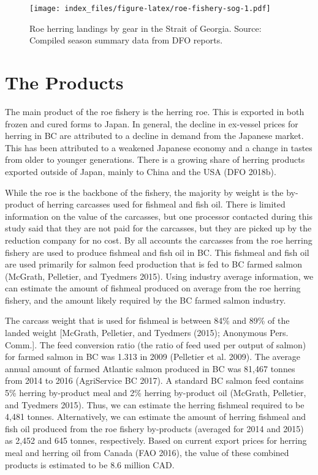 \documentclass[]{article}
\theoremstyle{definition}
\theoremstyle{definition}
\theoremstyle{definition}
\theoremstyle{remark}
\begin{document}
\begin{figure}
\centering
\texttt{[image: index\_files/figure-latex/roe-fishery-sog-1.pdf]}
\caption{\label{fig:roe-fishery-sog}Roe herring landings by gear in the
Strait of Georgia. Source: Compiled season summary data from DFO
reports.}
\end{figure}

\section{The Products}\label{the-products}

The main product of the roe fishery is the herring roe. This is exported
in both frozen and cured forms to Japan. In general, the decline in
ex-vessel prices for herring in BC are attributed to a decline in demand
from the Japanese market. This has been attributed to a weakened
Japanese economy and a change in tastes from older to younger
generations. There is a growing share of herring products exported
outside of Japan, mainly to China and the USA (DFO 2018b).

While the roe is the backbone of the fishery, the majority by weight is
the by-product of herring carcasses used for fishmeal and fish oil.
There is limited information on the value of the carcasses, but one
processor contacted during this study said that they are not paid for
the carcasses, but they are picked up by the reduction company for no
cost. By all accounts the carcasses from the roe herring fishery are
used to produce fishmeal and fish oil in BC. This fishmeal and fish oil
are used primarily for salmon feed production that is fed to BC farmed
salmon (McGrath, Pelletier, and Tyedmers 2015). Using industry average
information, we can estimate the amount of fishmeal produced on average
from the roe herring fishery, and the amount likely required by the BC
farmed salmon industry.

The carcass weight that is used for fishmeal is between 84\% and 89\% of
the landed weight {[}McGrath, Pelletier, and Tyedmers (2015); Anonymous
Pers. Comm.{]}. The feed conversion ratio (the ratio of feed used per
output of salmon) for farmed salmon in BC was 1.313 in 2009 (Pelletier
et al. 2009). The average annual amount of farmed Atlantic salmon
produced in BC was 81,467 tonnes from 2014 to 2016 (AgriService BC
2017). A standard BC salmon feed contains 5\% herring by-product meal
and 2\% herring by-product oil (McGrath, Pelletier, and Tyedmers 2015).
Thus, we can estimate the herring fishmeal required to be 4,481 tonnes.
Alternatively, we can estimate the amount of herring fishmeal and fish
oil produced from the roe fishery by-products (averaged for 2014 and
2015) as 2,452 and 645 tonnes, respectively. Based on current export
prices for herring meal and herring oil from Canada (FAO 2016), the
value of these combined products is estimated to be 8.6 million CAD.
\end{document}
